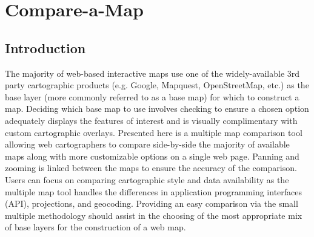 \documentclass[12pt,letterpaper]{article}
\begin{document}
			

\section{Compare-a-Map}
\subsection{Introduction}
The majority of web-based interactive maps use one of the widely-available 3rd party cartographic products (e.g. Google, Mapquest, OpenStreetMap, etc.) as the base layer (more commonly referred to as a base map) for which to construct a map. Deciding which base map to use involves checking to ensure a chosen option adequately displays the features of interest and is visually complimentary with custom cartographic overlays.  Presented here is a multiple map comparison tool allowing web cartographers to compare side-by-side the majority of available maps along with more customizable options on a single web page. Panning and zooming is linked between the maps to ensure the accuracy of the comparison. Users can focus on comparing cartographic style and data availability as the multiple map tool handles the differences in application programming interfaces (API), projections, and geocoding.  Providing an easy comparison via the small multiple methodology should assist in the choosing \parencite{Tufte1990} of the most appropriate mix of base layers for the construction of a web map.
\end{document}
